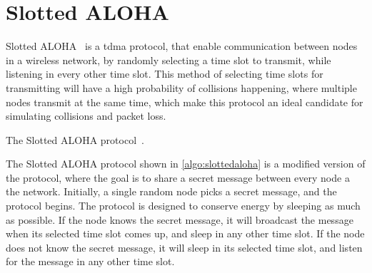 
\section{Slotted ALOHA}\label{sec:saloha}
Slotted ALOHA~\cite{Roberts:1975:APS:1024916.1024920} is a \gls{tdma} protocol, that enable communication between nodes in a wireless network, by randomly selecting a time slot to transmit, while listening in every other time slot. This method of selecting time slots for transmitting will have a high probability of collisions happening, where multiple nodes transmit at the same time, which make this protocol an ideal candidate for simulating collisions and packet loss. 

\begin{algorithm}[ht]
    \DontPrintSemicolon


    \caption{The Slotted ALOHA protocol~\cite{Roberts:1975:APS:1024916.1024920}.}
    \label{algo:slottedaloha}
\end{algorithm}

The Slotted ALOHA protocol shown in \autoref{algo:slottedaloha} is a modified version of the protocol, where the goal is to share a secret message between every node a the network. Initially, a single random node picks a secret message, and the protocol begins. The protocol is designed to conserve energy by sleeping as much as possible. If the node knows the secret message, it will broadcast the message when its selected time slot comes up, and sleep in any other time slot. If the node does not know the secret message, it will sleep in its selected time slot, and listen for the message in any other time slot.

